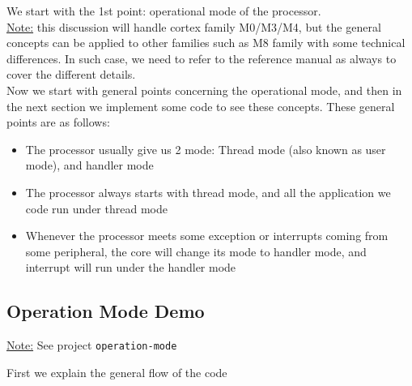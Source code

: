We start with the 1st point: operational mode of the processor.\\

\underline{Note:} this discussion will handle cortex family M0/M3/M4, but the general concepts can be applied to other families such as M8 family with some technical differences. In such case, we need to refer to the reference manual as always to cover the different details.\\

Now we start with general points concerning the operational mode, and then in the next section we implement some code to see these concepts. These general points are as follows:

\begin{itemize}
    \item The processor usually give us 2 mode: Thread mode (also known as user mode), and handler mode

    \item The processor always starts with thread mode, and all the application we code run under thread mode

    \item Whenever the processor meets some exception or interrupts coming from some peripheral,  the core will change its mode to handler mode, and interrupt will run under the handler mode
    
\end{itemize}

\newpage
\subsection{Operation Mode Demo}
\label{Sub:Operation_Mode_Demo}

\underline{Note:} See project \verb|operation-mode|

First we explain the general flow of the code

